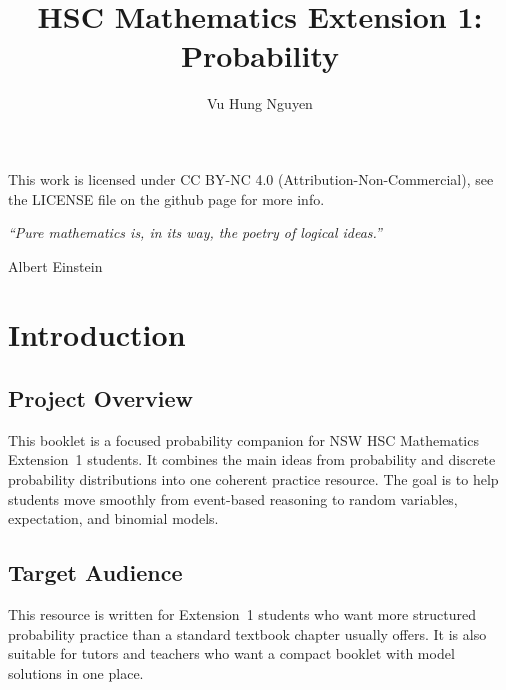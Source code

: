 \documentclass[12pt]{article}
\author{Vu Hung Nguyen}
\title{HSC Mathematics Extension 1: Probability}
\date{}
\begin{document}


\newpage


\begingroup\small\noindent This work is licensed under CC BY-NC 4.0 (Attribution-Non-Commercial), see the LICENSE file on the github page for more info.\par\endgroup

\newpage
\thispagestyle{empty}
\vspace*{\fill}
\begin{center}
\itshape
``Pure mathematics is, in its way, the poetry of logical ideas.''

\vspace{1em}
\normalfont Albert Einstein
\end{center}
\vspace*{\fill}

\newpage
\tableofcontents
\newpage

\section{Introduction}

\subsection{Project Overview}
This booklet is a focused probability companion for NSW HSC Mathematics Extension~1 students. It combines the main ideas from probability and discrete probability distributions into one coherent practice resource. The goal is to help students move smoothly from event-based reasoning to random variables, expectation, and binomial models.

\subsection{Target Audience}
This resource is written for Extension~1 students who want more structured probability practice than a standard textbook chapter usually offers. It is also suitable for tutors and teachers who want a compact booklet with model solutions in one place.
\end{document}
